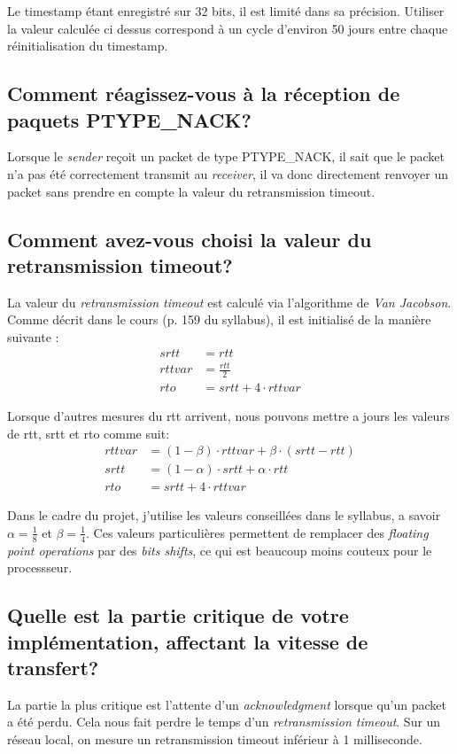 \documentclass[10pt,a4paper]{article}
\begin{document}
Le timestamp étant enregistré sur 32 bits, il est limité dans sa précision. Utiliser la valeur calculée ci dessus correspond à un cycle d'environ 50 jours entre chaque réinitialisation du timestamp.

\subsection{Comment réagissez-vous à la réception de paquets PTYPE\_NACK?}
Lorsque le \textit{sender} reçoit un packet de type PTYPE\_NACK, il sait que le packet n'a pas été correctement transmit au \textit{receiver}, il va donc directement renvoyer un packet sans prendre en compte la valeur du retransmission timeout. 


\subsection{Comment avez-vous choisi la valeur du retransmission timeout?}
La valeur du \textit{retransmission timeout} est calculé via l'algorithme de \textit{Van Jacobson}. Comme décrit dans le cours (p. 159 du syllabus), il est initialisé de la manière suivante : 
\begin{align*}
	srtt &= rtt \\
	rttvar &= \frac{rtt}{2} \\
	rto &= srtt + 4 \cdot rttvar
\end{align*}

Lorsque d'autres mesures du rtt arrivent, nous pouvons mettre a jours les valeurs de rtt, srtt et rto comme suit:
\begin{align*}
	rttvar &= (1-\beta) \cdot rttvar + \beta \cdot (srtt - rtt) \\
	srtt &= (1-\alpha) \cdot srtt + \alpha \cdot rtt \\
	rto &= srtt + 4 \cdot rttvar
\end{align*}

Dans le cadre du projet, j'utilise les valeurs conseillées dans le syllabus, a savoir $\alpha = \frac{1}{8}$ et $\beta = \frac{1}{4}$. Ces valeurs particulières permettent de remplacer des \textit{floating point operations} par des \textit{bits shifts}, ce qui est beaucoup moins couteux pour le processseur.

\subsection{Quelle est la partie critique de votre implémentation, affectant la vitesse de transfert?}
La partie la plus critique est l'attente d'un \textit{acknowledgment} lorsque qu'un packet a été perdu. Cela nous fait perdre le temps d'un \textit{retransmission timeout}. Sur un réseau local, on mesure un retransmission timeout inférieur à 1 milliseconde.
\end{document}
